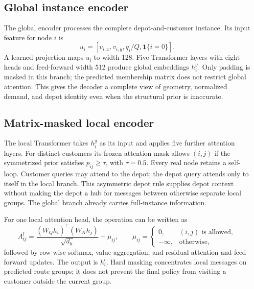 \documentclass[11pt,a4paper]{article}
\begin{document}
\subsection{Global instance encoder}

The global encoder processes the complete depot-and-customer instance.
Its input feature for node $i$ is
\begin{equation}
 u_i=[v_{i,x},v_{i,y},q_i/Q,\mathbf 1\{i=0\}].
 \label{eq:node-features}
\end{equation}
A learned projection maps $u_i$ to width 128. Five Transformer layers
with eight heads and feed-forward width 512 produce global embeddings
$h_i^g$. Only padding is masked in this branch; the predicted membership
matrix does not restrict global attention. This gives the decoder a
complete view of geometry, normalized demand, and depot identity even
when the structural prior is inaccurate.

\subsection{Matrix-masked local encoder}

The local Transformer takes $h_i^g$ as its input and applies five further
attention layers. For distinct customers its frozen attention mask allows
$(i,j)$ if the symmetrized prior satisfies $p_{ij}\geq\tau$, with
$\tau=0.5$. Every real node retains a self-loop. Customer queries may
attend to the depot; the depot query attends only to itself in the local
branch. This asymmetric depot rule supplies depot context without making
the depot a hub for messages between otherwise separate local groups.
The global branch already carries full-instance information.

For one local attention head, the operation can be written as
\begin{equation}
 A^l_{ij}=\frac{(W_Q h_i)^\top(W_K h_j)}{\sqrt{d_h}}
             +\mu_{ij},\qquad
 \mu_{ij}=\begin{cases}0,&(i,j)\text{ is allowed},\\
                     -\infty,&\text{otherwise},\end{cases}
 \label{eq:local-attention}
\end{equation}
followed by row-wise softmax, value aggregation, and residual attention
and feed-forward updates. The output is $h_i^l$. Hard masking concentrates
local messages on predicted route groups; it does not prevent the final
policy from visiting a customer outside the current group.
\end{document}
